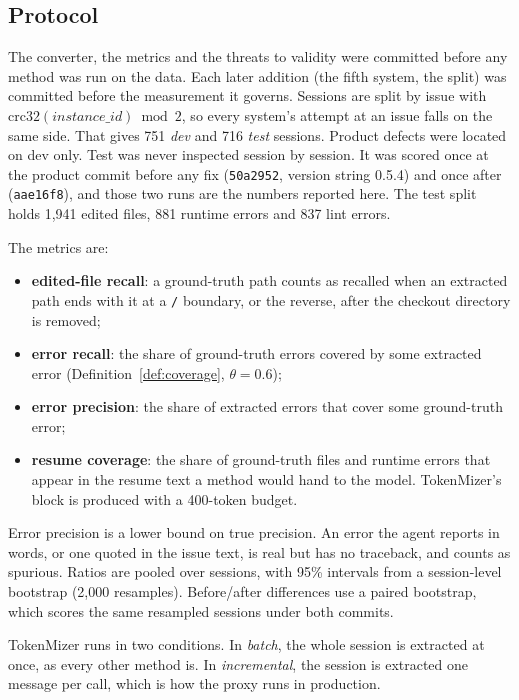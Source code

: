\documentclass[journal]{IEEEtran}
\begin{document}
\subsection{Protocol}
\label{sec:real-protocol}

The converter, the metrics and the threats to validity were
committed before any method was run on the data. Each later
addition (the fifth system, the split) was committed before the
measurement it governs.
Sessions are split by issue with
$\mathrm{crc32}(\textit{instance\_id}) \bmod 2$, so every
system's attempt at an issue falls on the same side. That gives
751 \emph{dev} and 716 \emph{test} sessions.
Product defects were located on dev only. Test was never
inspected session by session. It was scored once at the product
commit before any fix (\texttt{50a2952}, version string 0.5.4)
and once after (\texttt{aae16f8}), and those two runs are the
numbers reported here.
The test split holds 1{,}941 edited files, 881 runtime errors
and 837 lint errors.

The metrics are:
\begin{itemize}
\item \textbf{edited-file recall}: a ground-truth path counts as
  recalled when an extracted path ends with it at a \texttt{/}
  boundary, or the reverse, after the checkout directory is
  removed;
\item \textbf{error recall}: the share of ground-truth errors
  covered by some extracted error (Definition~\ref{def:coverage},
  $\theta=0.6$);
\item \textbf{error precision}: the share of extracted errors
  that cover some ground-truth error;
\item \textbf{resume coverage}: the share of ground-truth files
  and runtime errors that appear in the resume text a method
  would hand to the model. TokenMizer's block is produced with a
  400-token budget.
\end{itemize}
Error precision is a lower bound on true precision. An error the
agent reports in words, or one quoted in the issue text, is real
but has no traceback, and counts as spurious.
Ratios are pooled over sessions, with 95\% intervals from a
session-level bootstrap (2{,}000 resamples). Before/after
differences use a paired bootstrap, which scores the same
resampled sessions under both commits.

TokenMizer runs in two conditions. In \emph{batch}, the whole
session is extracted at once, as every other method is. In
\emph{incremental}, the session is extracted one message per
call, which is how the proxy runs in production.
\end{document}

